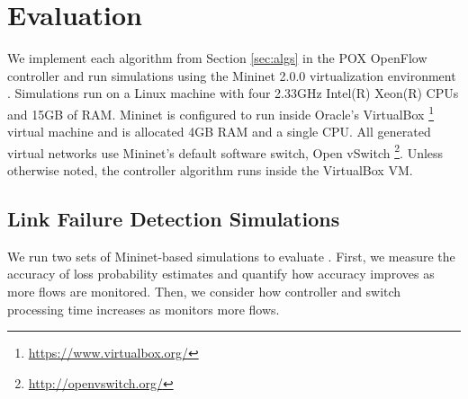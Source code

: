 \section{Evaluation}
\label{sec:evaluation}

We implement each algorithm from Section \ref{sec:algs} in the POX OpenFlow controller \cite{Pox} and run simulations using the Mininet 2.0.0 virtualization 
environment \cite{Lantz10}.  Simulations run on a Linux machine 
with four 2.33GHz Intel(R) Xeon(R) CPUs and 15GB of RAM.  Mininet is configured to run inside Oracle's VirtualBox \footnote{\url{https://www.virtualbox.org/}}
virtual machine and is allocated 4GB RAM and a single CPU.  
All generated virtual networks use Mininet's default software switch, Open vSwitch \footnote{\url{http://openvswitch.org/}}.  Unless otherwise noted, the \mdr 
controller algorithm runs inside the VirtualBox VM.



\subsection{Link Failure Detection Simulations}
\label{subsec:eval-pcount}

We run two sets of Mininet-based simulations to evaluate \pcnts. First, we measure the accuracy of \pcnt loss probability estimates and quantify how accuracy improves as more flows are monitored. 
Then, we consider how controller and switch processing time increases as \pcnt monitors more flows. 


